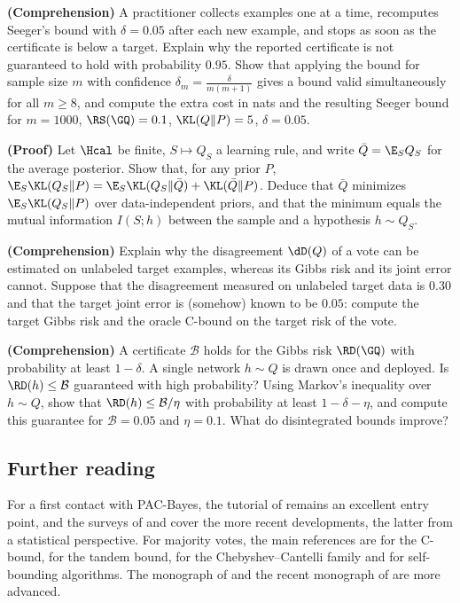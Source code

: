 \begin{exercises}
\begin{exercise}
\textbf{(Comprehension)} A practitioner collects examples one at a time, recomputes
Seeger's bound with $\delta=0.05$ after each new example, and stops as soon as the
certificate is below a target. Explain why the reported certificate is not guaranteed
to hold with probability $0.95$. Show that applying the bound for sample size $m$ with
confidence $\delta_m=\frac{\delta}{m(m+1)}$ gives a bound valid simultaneously for all
$m\geq8$, and compute the extra cost in nats and the resulting Seeger bound for
$m=1000$, $\RS(\GQ)=0.1$, $\KL(Q\|P)=5$, $\delta=0.05$.
\end{exercise}
\begin{exercise}
\textbf{(Proof)} Let $\Hcal$ be finite, $S\mapsto Q_S$ a learning rule, and write
$\bar Q=\E_S Q_S$ for the average posterior. Show that, for any prior $P$,
$\E_S\KL(Q_S\|P)=\E_S\KL(Q_S\|\bar Q)+\KL(\bar Q\|P)$. Deduce that $\bar Q$ minimizes
$\E_S\KL(Q_S\|P)$ over data-independent priors, and that the minimum equals the mutual
information $I(S;h)$ between the sample and a hypothesis $h\sim Q_S$.
\end{exercise}
\begin{exercise}
\textbf{(Comprehension)} Explain why the disagreement $\dD(Q)$ of a vote can be
estimated on unlabeled target examples, whereas its Gibbs risk and its joint error cannot.
Suppose that the disagreement measured on unlabeled target data is $0.30$ and that the
target joint error is (somehow) known to be $0.05$: compute the target Gibbs risk and the
oracle C-bound on the target risk of the vote.
\end{exercise}
\begin{exercise}
\textbf{(Comprehension)} A certificate $\mathcal B$ holds for the Gibbs risk $\RD(\GQ)$
with probability at least $1-\delta$. A single network $h\sim Q$ is drawn once and deployed.
Is $\RD(h)\leq\mathcal B$ guaranteed with high probability? Using Markov's inequality over
$h\sim Q$, show that $\RD(h)\leq\mathcal B/\eta$ with probability at least $1-\delta-\eta$, and
compute this guarantee for $\mathcal B=0.05$ and $\eta=0.1$. What do disintegrated bounds
improve?
\end{exercise}
\end{exercises}

\subsection*{Further reading}

For a first contact with PAC-Bayes, the tutorial of \citet{langford2005tutorial}
remains an excellent entry point, and the surveys of \citet{guedj2019primer} and
\citet{alquier2024user} cover the more recent developments, the latter from a
statistical perspective. For majority votes, the main references are
\citet{germain2015risk} for the C-bound, \citet{masegosa2020second} for the tandem
bound, \citet{wu2021chebyshev} for the Chebyshev--Cantelli family and
\citet{viallard2021self} for self-bounding algorithms. The monograph of
\citet{catoni2007pac} and the recent monograph of \citet{hellstrom2025generalization}
are more advanced.
